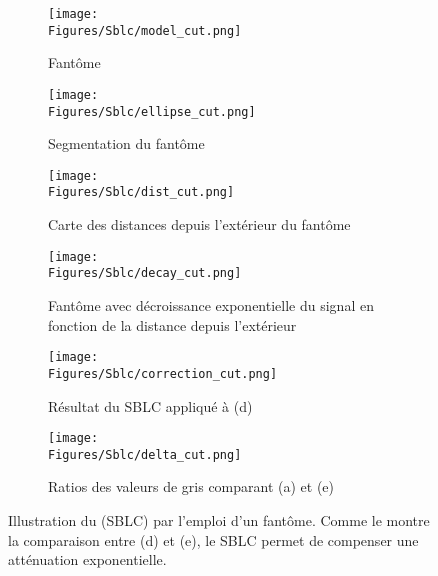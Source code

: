\documentclass[\main/main.tex]{subfiles}
\begin{document}
\begin{figure}[h!]

    \centering
    \begin{subfigure}[b]{0.30\textwidth}
       \caption{
        \centering
            \label{fig:sblc:algo:model}
            Fantôme
            }
       \centering \texttt{[image: \\Figures/Sblc/model\_cut.png]}
    \end{subfigure}
    \begin{subfigure}[b]{0.30\textwidth}
       \caption{
        \centering
            \label{fig:sblc:algo:ellipse}
            Segmentation du fantôme
            }
       \centering \texttt{[image: \\Figures/Sblc/ellipse\_cut.png]}
    \end{subfigure}
    \begin{subfigure}[b]{0.30\textwidth}
       \caption{
        \centering
            \label{fig:sblc:algo:dist}
            Carte des distances depuis l'extérieur du fantôme
            }
       \centering \texttt{[image: \\Figures/Sblc/dist\_cut.png]}
    \end{subfigure}
    \begin{subfigure}[b]{0.30\textwidth}
       \caption{
        \centering
            \label{fig:sblc:algo:decay}
            Fantôme avec décroissance exponentielle du signal en fonction de la distance depuis l'extérieur
            }
       \centering \texttt{[image: \\Figures/Sblc/decay\_cut.png]}
    \end{subfigure}
    \begin{subfigure}[b]{0.30\textwidth}
       \caption{
        \centering
            \label{fig:sblc:algo:correction}
            Résultat du SBLC appliqué à (d)
            }
       \centering \texttt{[image: \\Figures/Sblc/correction\_cut.png]}
    \end{subfigure}
    \begin{subfigure}[b]{0.30\textwidth}
       \caption{
        \centering
            \label{fig:sblc:algo:ratio}
            Ratios des valeurs de gris comparant (a) et (e)
            }
       \centering \texttt{[image: \\Figures/Sblc/delta\_cut.png]}
    \end{subfigure}
    \caption{
        \label{fig:sblc:algo}
        Illustration du \sblc{} (SBLC) par l'emploi d'un fantôme.
        \newline
        Comme le montre la comparaison entre (d) et (e), le SBLC permet de compenser une atténuation exponentielle.
    }
\end{figure}
\end{document}
